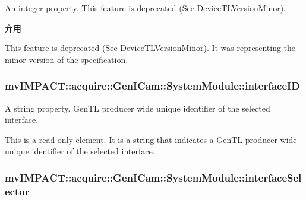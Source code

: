 An integer property. This feature is deprecated (See Device\+T\+L\+Version\+Minor). 

\begin{DoxyRefDesc}{弃用}
\item[\hyperlink{deprecated__deprecated000095}{弃用}]This feature is deprecated (See Device\+T\+L\+Version\+Minor). It was representing the minor version of the specification. \end{DoxyRefDesc}
\hypertarget{classmv_i_m_p_a_c_t_1_1acquire_1_1_gen_i_cam_1_1_system_module_a41763f2b261c03af6c0a8870e5d60a9f}{
\subsubsection[{interface\+I\+D}]{ mv\+I\+M\+P\+A\+C\+T\+::acquire\+::\+Gen\+I\+Cam\+::\+System\+Module\+::interface\+I\+D}}\label{classmv_i_m_p_a_c_t_1_1acquire_1_1_gen_i_cam_1_1_system_module_a41763f2b261c03af6c0a8870e5d60a9f}


A string property. Gen\+T\+L producer wide unique identifier of the selected interface. 

This is a read only element. It is a string that indicates a Gen\+T\+L producer wide unique identifier of the selected interface. \hypertarget{classmv_i_m_p_a_c_t_1_1acquire_1_1_gen_i_cam_1_1_system_module_a48b00bc5a21e9f7839039da1f3555d47}{
\subsubsection[{interface\+Selector}]{ mv\+I\+M\+P\+A\+C\+T\+::acquire\+::\+Gen\+I\+Cam\+::\+System\+Module\+::interface\+Selector}}\label{classmv_i_m_p_a_c_t_1_1acquire_1_1_gen_i_cam_1_1_system_module_a48b00bc5a21e9f7839039da1f3555d47}


